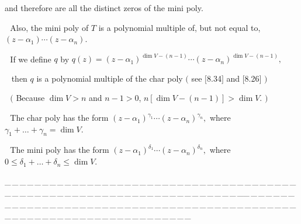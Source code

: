 \documentclass[a4paper, 11pt, UTF8]{article}
\begin{document}
\begin{large}
and therefore are all the distinct zeros of the mini poly.\par\,\,
Also, the mini poly of $T$ is a polynomial multiple of, but not equal to, $(z-\alpha_1)\cdots(z-\alpha_n)$.\par\,\,
If we define $q$ by $q(z)=(z-\alpha_1)^{\dim V-(n-1)}\cdots(z-\alpha_n)^{\dim V-(n-1)},$\par\qquad\quad\,\,\,
then $q$ is a polynomial multiple of the char poly $($ see $[$8.34$]$ and $[$8.26$]$ $)$\par\,\,
$($ Because $\dim V>n$ and $n-1>0$, $n[\dim V-(n-1)]>\dim V$. $)$\par\,\,
The char poly has the form $(z-\alpha_1)^{\gamma_1}\cdots(z-\alpha_n)^{\gamma_n},$ where $\gamma_1+\dots+\gamma_n=\dim V.$\par\,\,
The mini poly has the form $(z-\alpha_1)^{\delta_1}\cdots(z-\alpha_n)^{\delta_n},$ where $0\leq \delta_1+\dots+\delta_n\leq \dim V.$\par\large
{\tiny \_\,\_\,\_\,\_\,\_\,\_\,\_\,\_\,\_\,\_\,\_\,\_\,\_\,\_\,\_\,\_\,\_\,\_\,\_\,\_\,\_\,\_\,\_\,\_\,\_\,\_\,\_\,\_\,\_\,\_\,\_\,\_\,\_\,\_\,\_\,\_\,\_\,\_\,\_\,\_\,\_\,\_\,\_\,\_\,\_\,\_\,\_\,\_\,\_\,\_\,\_\,\_\,\_\,\_\,\_\,\_\,\_\,\_\,\_\,\_\,\_\,\_\,\_\,\_\,\_\,\_\,\_\,\_\,\_\,\_\,\_\_\,\_\,\_\,\_\,\_\,\_\,\_\,\_\,\_\,\_\,\_\,\_\,\_\,\_\,\_\,\_\,\_\,\_\,\_\,\_\,\_\,\_\,\_\,\_\,\_\,\_\,\_\,\_\,\_\,\_\,\_\,\_\,\_\,\_\,\_\,\_\,\_\,\_\,\_\,\_\,\_\,\_\,\_\,\_\,\_\,\_\,\_\,\_\,\_\,\_\,\_\,\_\,\_\,\_\,\_\,\_\,\_\,\_\,\_\,\_\,\_\,\_\,\_\,\_\,\_\,\_\,\_\,\_\,\_\,\_\,\_}\par


\end{large}
\end{document}
